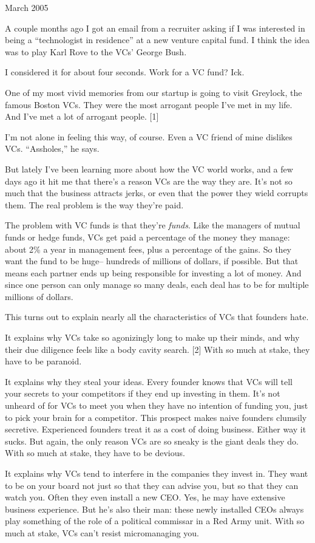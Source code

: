 March 2005

A couple months ago I got an email from a recruiter asking if I was
interested in being a ``technologist in residence'' at a new venture
capital fund. I think the idea was to play Karl Rove to the VCs' George
Bush.

I considered it for about four seconds. Work for a VC fund? Ick.

One of my most vivid memories from our startup is going to visit
Greylock, the famous Boston VCs. They were the most arrogant people I've
met in my life. And I've met a lot of arrogant people. {[}1{]}

I'm not alone in feeling this way, of course. Even a VC friend of mine
dislikes VCs. ``Assholes,'' he says.

But lately I've been learning more about how the VC world works, and a
few days ago it hit me that there's a reason VCs are the way they are.
It's not so much that the business attracts jerks, or even that the
power they wield corrupts them. The real problem is the way they're
paid.

The problem with VC funds is that they're \emph{funds}. Like the
managers of mutual funds or hedge funds, VCs get paid a percentage of
the money they manage: about 2\% a year in management fees, plus a
percentage of the gains. So they want the fund to be huge-- hundreds of
millions of dollars, if possible. But that means each partner ends up
being responsible for investing a lot of money. And since one person can
only manage so many deals, each deal has to be for multiple millions of
dollars.

This turns out to explain nearly all the characteristics of VCs that
founders hate.

It explains why VCs take so agonizingly long to make up their minds, and
why their due diligence feels like a body cavity search. {[}2{]} With so
much at stake, they have to be paranoid.

It explains why they steal your ideas. Every founder knows that VCs will
tell your secrets to your competitors if they end up investing in them.
It's not unheard of for VCs to meet you when they have no intention of
funding you, just to pick your brain for a competitor. This prospect
makes naive founders clumsily secretive. Experienced founders treat it
as a cost of doing business. Either way it sucks. But again, the only
reason VCs are so sneaky is the giant deals they do. With so much at
stake, they have to be devious.

It explains why VCs tend to interfere in the companies they invest in.
They want to be on your board not just so that they can advise you, but
so that they can watch you. Often they even install a new CEO. Yes, he
may have extensive business experience. But he's also their man: these
newly installed CEOs always play something of the role of a political
commissar in a Red Army unit. With so much at stake, VCs can't resist
micromanaging you.

